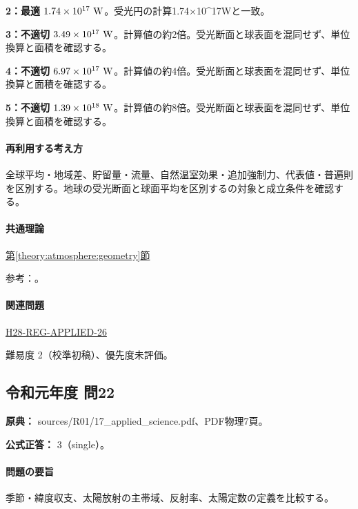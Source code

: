 \noindent\textbf{2：最適} \(1.74\times10^{17}\ {\rm W}\)。受光円の計算1.74×10\textasciicircum{}17Wと一致。\par

\noindent\textbf{3：不適切} \(3.49\times10^{17}\ {\rm W}\)。計算値の約2倍。受光断面と球表面を混同せず、単位換算と面積を確認する。\par

\noindent\textbf{4：不適切} \(6.97\times10^{17}\ {\rm W}\)。計算値の約4倍。受光断面と球表面を混同せず、単位換算と面積を確認する。\par

\noindent\textbf{5：不適切} \(1.39\times10^{18}\ {\rm W}\)。計算値の約8倍。受光断面と球表面を混同せず、単位換算と面積を確認する。\par

\paragraph{再利用する考え方} 全球平均・地域差、貯留量・流量、自然温室効果・追加強制力、代表値・普遍則を区別する。地球の受光断面と球面平均を区別するの対象と成立条件を確認する。

\paragraph{共通理論} \hyperref[theory:atmosphere:geometry]{第\ref*{theory:atmosphere:geometry}節}

\par 参考：\cite{atm_nasa_budget}。

\paragraph{関連問題} \hyperref[q:h28-reg-applied-26]{H28-REG-APPLIED-26}

\par 難易度 2（校準初稿）、優先度未評価。

\subsection{令和元年度 問22}
\label{q:r01-reg-applied-22}

\noindent\textbf{原典：} sources/R01/17\_applied\_science.pdf、PDF物理7頁。

\textbf{公式正答：} 3（single）。

\paragraph{問題の要旨} 季節・緯度収支、太陽放射の主帯域、反射率、太陽定数の定義を比較する。

